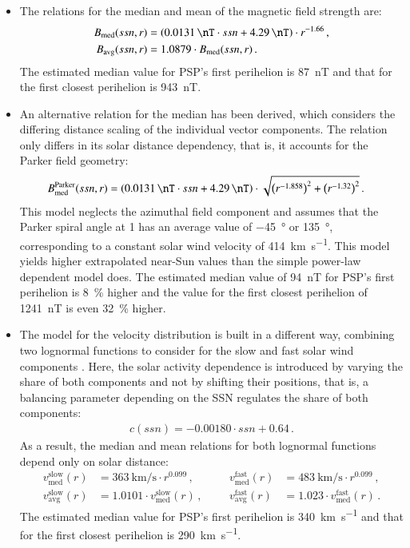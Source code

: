\begin{itemize}
	\item The relations for the median and mean of the magnetic field strength are:
	\begin{align*}
		B_\text{med}(ssn,r) &= \left(\SI{0.0131}{\nT} \cdot ssn + \SI{4.29}{\nT}\right) \cdot r^{-1.66}	\,,\\
		B_\text{avg}(ssn,r) &= 1.0879 \cdot B_\text{med}(ssn,r)	\,.
	\end{align*}
	 The estimated median value for PSP's first perihelion is \SI{87}{\nano\tesla} and that for the first closest perihelion is \SI{943}{\nano\tesla}.
	
	\item An alternative relation for the median has been derived, which considers the differing distance scaling of the individual vector components. The relation only differs in its solar distance dependency, that is, it accounts for the Parker field geometry:
	\begin{align*}
		B^\text{Parker}_\text{med}(ssn,r) &= \left(\SI{0.0131}{\nT} \cdot ssn + \SI{4.29}{\nT}\right) \cdot \sqrt{\left(r^{-1.858}\right)^2 + \left(r^{-1.32}\right)^2}	\,.
	\end{align*}
	This model neglects the azimuthal field component and assumes that the Parker spiral angle at \SI{1}{\au} has an average value of \SI{-45}{\degree} or \SI{135}{\degree}, corresponding to a constant solar wind velocity of \SI{414}{\km\per\s}.
	This model yields higher extrapolated near-Sun values than the simple power-law dependent model does. The estimated median value of \SI{94}{\nano\tesla} for PSP's first perihelion is \SI{8}{\%} higher and the value for the first closest perihelion of \SI{1241}{\nano\tesla} is even \SI{32}{\%} higher.

	\pagebreak

	\item The model for the velocity distribution is built in a different way, combining two lognormal functions to consider for the slow and fast solar wind components \citep[see the Equation~(5) in][]{Venzmer2018}. Here, the solar activity dependence is introduced by varying the share of both components and not by shifting their positions, that is, a balancing parameter depending on the SSN regulates the share of both components:
	\begin{align*}
		c(ssn) = -0.00180 \cdot ssn + 0.64	\,.
	\end{align*}
	As a result, the median and mean relations for both lognormal functions depend only on solar distance:
	\begin{align*}
		v_\text{med}^\text{slow}(r) &= \SI{363}{\km\per\s} \cdot r^{0.099}	\,,&    &       &v_\text{med}^\text{fast}(r) &= \SI{483}{\km\per\s} \cdot r^{0.099}	\,,\\
		v_\text{avg}^\text{slow}(r) &= 1.0101 \cdot v_\text{med}^\text{slow}(r)	\,,&    &       &v_\text{avg}^\text{fast}(r) &= 1.023 \cdot v_\text{med}^\text{fast}(r)	\,.
	\end{align*}
	 The estimated median value for PSP's first perihelion is \SI{340}{\km\per\s} and that for the first closest perihelion is \SI{290}{\km\per\s}.
	

\end{itemize}
